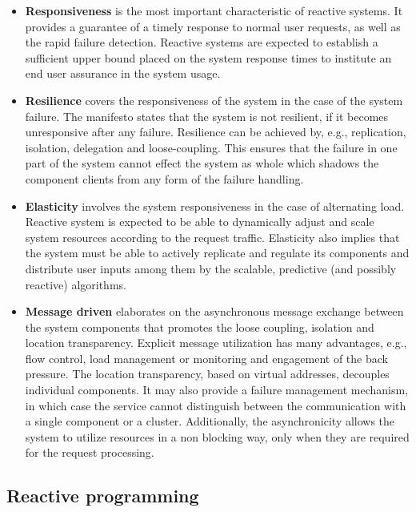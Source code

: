 \documentclass[oneside,
  digital, %
  table,   %
  nolof,     %
  nolot,     %
]{fithesis3}
\begin{document}
\begin{itemize}
    \item \textbf{Responsiveness} is the most important characteristic of reactive systems. It provides a guarantee of a timely response to normal user requests, as well as the rapid failure detection. Reactive systems are expected to establish a sufficient upper bound placed on the system response times to institute an end user assurance in the system usage.
    
    \item \textbf{Resilience} covers the responsiveness of the system in the case of the system failure. The manifesto states that the system is not resilient, if it becomes unresponsive after any failure. Resilience can be achieved by, e.g., replication, isolation, delegation and loose-coupling. This ensures that the failure in one part of the system cannot effect the system as whole which shadows the component clients from any form of the failure handling.
    
    \item \textbf{Elasticity} involves the system responsiveness in the case of alternating load. Reactive system is expected to be able to dynamically adjust and scale system resources according to the request traffic. Elasticity also implies that the system must be able to actively replicate and regulate its components and distribute user inputs among them by the scalable, predictive (and possibly reactive) algorithms.
    
    \item \textbf{Message driven} elaborates on the asynchronous message exchange between the system components that promotes the loose coupling, isolation and location transparency. Explicit message utilization has many advantages, e.g., flow control, load management or monitoring and engagement of the back pressure. The location transparency, based on virtual addresses, decouples individual components. It may also provide a failure management mechanism, in which case the service cannot distinguish between the communication with a single component or a cluster. Additionally, the asynchronicity allows the system to utilize resources in a non blocking way, only when they are required for the request processing. 
\end{itemize}

\subsection{Reactive programming}
\end{document}

